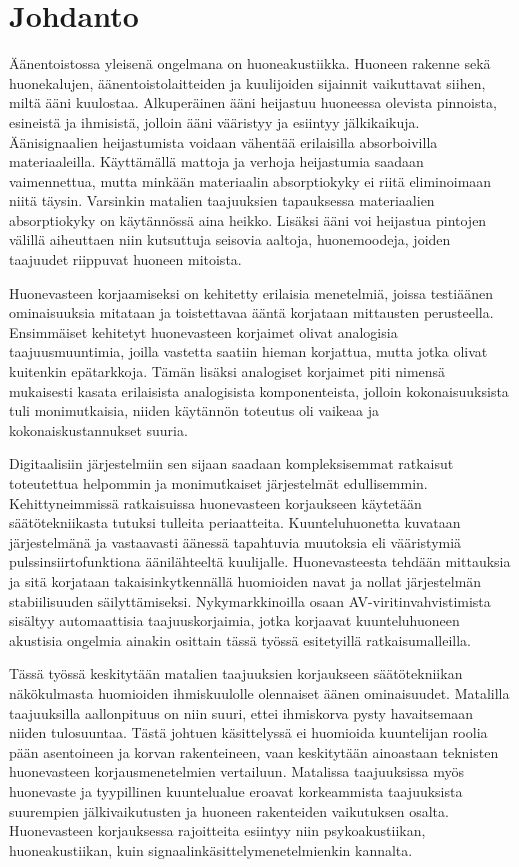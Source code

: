 \documentclass[finnish,12pt]{article}
\begin{document}
\section{Johdanto}

\thispagestyle{empty}

Äänentoistossa yleisenä ongelmana on huoneakustiikka. Huoneen rakenne sekä huonekalujen, äänentoistolaitteiden ja kuulijoiden sijainnit vaikuttavat siihen, miltä ääni kuulostaa. Alkuperäinen ääni heijastuu huoneessa olevista pinnoista, esineistä ja ihmisistä, jolloin ääni vääristyy ja esiintyy jälkikaikuja. Äänisignaalien heijastumista voidaan vähentää erilaisilla absorboivilla materiaaleilla. Käyttämällä mattoja ja verhoja heijastumia saadaan vaimennettua, mutta minkään materiaalin absorptiokyky ei riitä eliminoimaan niitä täysin. Varsinkin matalien taajuuksien tapauksessa materiaalien absorptiokyky on käytännössä aina heikko. Lisäksi ääni voi heijastua pintojen välillä aiheuttaen niin kutsuttuja seisovia aaltoja, huonemoodeja, joiden taajuudet riippuvat huoneen mitoista. \cite{MMiyoshi1988}

Huonevasteen korjaamiseksi on kehitetty erilaisia menetelmiä, joissa testiäänen ominaisuuksia mitataan ja toistettavaa ääntä korjataan mittausten perusteella. Ensimmäiset kehitetyt huonevasteen korjaimet olivat analogisia taajuusmuuntimia, joilla vastetta saatiin hieman korjattua, mutta jotka olivat kuitenkin epätarkkoja. Tämän lisäksi analogiset korjaimet piti nimensä mukaisesti kasata erilaisista analogisista komponenteista, jolloin kokonaisuuksista tuli monimutkaisia, niiden käytännön toteutus oli vaikeaa ja kokonaiskustannukset suuria.

Digitaalisiin järjestelmiin sen sijaan saadaan kompleksisemmat ratkaisut toteutettua helpommin ja monimutkaiset järjestelmät edullisemmin. Kehittyneimmissä ratkaisuissa huonevasteen korjaukseen käytetään säätötekniikasta tutuksi tulleita periaatteita. Kuunteluhuonetta kuvataan järjestelmänä ja vastaavasti äänessä tapahtuvia muutoksia eli vääristymiä pulssinsiirtofunktiona äänilähteeltä kuulijalle. Huonevasteesta tehdään mittauksia ja sitä korjataan takaisinkytkennällä huomioiden navat ja nollat järjestelmän stabiilisuuden säilyttämiseksi. Nykymarkkinoilla osaan AV-viritinvahvistimista sisältyy automaattisia taajuuskorjaimia, jotka korjaavat kuunteluhuoneen akustisia ongelmia ainakin osittain tässä työssä esitetyillä ratkaisumalleilla. 

Tässä työssä keskitytään matalien taajuuksien korjaukseen säätötekniikan näkökulmasta huomioiden ihmiskuulolle olennaiset äänen ominaisuudet. Matalilla taajuuksilla aallonpituus on niin suuri, ettei ihmiskorva pysty havaitsemaan niiden tulosuuntaa. Tästä johtuen käsittelyssä ei huomioida kuuntelijan roolia pään asentoineen ja korvan rakenteineen, vaan keskitytään ainoastaan teknisten huonevasteen korjausmenetelmien vertailuun. Matalissa taajuuksissa myös huonevaste ja tyypillinen kuuntelualue eroavat korkeammista taajuuksista suurempien jälkivaikutusten ja huoneen rakenteiden vaikutuksen osalta. Huonevasteen korjauksessa rajoitteita esiintyy niin psykoakustiikan, huoneakustiikan, kuin signaalinkäsittelymenetelmienkin kannalta. \cite{MKarjalainen2005}
\end{document}
